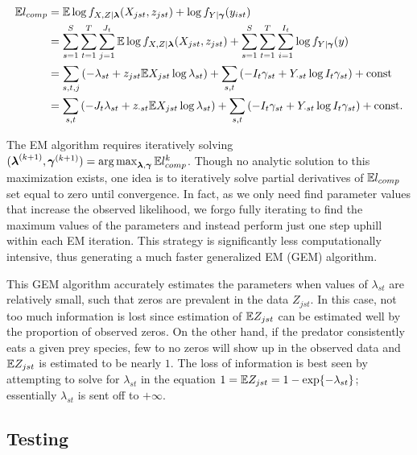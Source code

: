 \begin{align*}
  \mathbb{E} l_{comp} 
  & = \mathbb{E} \log{f_{X,Z|\boldsymbol{\lambda}}(X_{jst},z_{jst})} + \log{f_{Y|\boldsymbol{\gamma}}(y_{ist})} \\
  & = \sum_{s=1}^S \sum_{t=1}^T \sum_{j=1}^{J_t} \mathbb{E} \log{f_{X,Z|\boldsymbol{\lambda}}(X_{jst},z_{jst})}
  + \sum_{s=1}^S \sum_{t=1}^T \sum_{i=1}^{I_t} \log{f_{Y|\boldsymbol{\gamma}}(y)} \\
  & = \sum_{s,t,j} \left( - \lambda_{st} 
    + z_{jst} \mathbb{E} X_{jst} \log{\lambda_{st}}  \right) + \sum_{s,t} \left( -I_t \gamma_{st} + Y_{\cdot st} \log{I_t \gamma_{st}} \right) + \text{const} \\
  & = \sum_{s,t} \left( -J_t \lambda_{st} + z_{\cdot st} \mathbb{E} X_{jst} \log{\lambda_{st}} \right) + \sum_{s,t} \left( -I_t \gamma_{st} + Y_{\cdot st} \log{I_t \gamma_{st}} \right) + \text{const}.
\end{align*}

The EM algorithm requires iteratively solving $(\boldsymbol{\lambda}^{(k+1)},\boldsymbol{\gamma}^{(k+1)}) = \operatorname*{arg\,max}_{\boldsymbol{\lambda},\boldsymbol{\gamma}} \mathbb{E} l_{comp}^k$.  Though no analytic solution to this maximization exists, one idea is to iteratively solve partial derivatives of $\mathbb{E} l_{comp}$ set equal to zero until convergence.  In fact, as we only need find parameter values that increase the observed likelihood, we forgo fully iterating to find the maximum values of the parameters and instead perform just one step uphill within each EM iteration.  This strategy is significantly less computationally intensive, thus generating a much faster generalized EM (GEM) algorithm.  

This GEM algorithm accurately estimates the parameters when values of $\lambda_{st}$ are relatively small, such that zeros are prevalent in the data $Z_{jst}$.  In this case, not too much information is lost since estimation of $\mathbb{E} Z_{jst}$ can be estimated well by the proportion of observed zeros.  On the other hand, if the predator consistently eats a given prey species, few to no zeros will show up in the observed data and $\mathbb{E} Z_{jst}$ is estimated to be nearly $1$.  The loss of information is best seen by attempting to solve for $\lambda_{st}$ in the equation $1 = \mathbb{E} Z_{jst} = 1 - \exp\{-\lambda_{st}\}$; essentially $\lambda_{st}$ is sent off to $+\infty$. 

\subsection{Testing}

